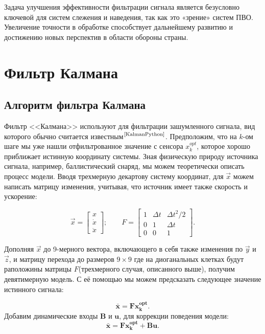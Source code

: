 \documentclass[a4paper,11pt]{article} %
\begin{document}
Задача улучшения эффективности фильтрации сигнала является безусловно ключевой для систем слежения и наведения, так как это «зрение» систем ПВО. Увеличение точности в обработке способствует дальнейшему развитию и достижению новых перспектив в области обороны страны.
\pagebreak

\section{Фильтр Калмана}
\subsection{Алгоритм фильтра Калмана}
Фильтр <<Калмана>> используют для фильтрации зашумленного сигнала,  вид которого обычно считается известным$^\text{\cite{KalmanPython}}$.
Предположим,  что на $k$-ом шаге мы уже нашли отфильтрованное значение с сенсора $x^{opt}_k$,  которое хорошо приближает истинную координату системы.  Зная физическую природу источника сигнала,  например,  баллистический снаряд,  мы можем теоретически описать процесс модели.  Вводя трехмерную декартову систему координат,  для  $\vec{x}$ можем написать матрицу изменения,  учитывая,   что источник имеет также скорость  и  ускорение:

\begin{equation}\label{xF}
\vec{x}=
\begin{bmatrix}
x\\
\dot{x}\\
\ddot{x}
\end{bmatrix} ;\qquad
F = \begin{bmatrix}1 & \Delta t & {\Delta t}^2/2 \\ 0 & 1 & \Delta t\\ 0& 0& 1\end{bmatrix}.
\end{equation}

Дополняя $\vec{x}$ до 9-мерного вектора,  включающего в себя также изменения по $\vec{y}$ и  $\vec{z}$, и матрицу  перехода до  размеров $9\times9$ где на  диоганальных клетках будут раположины матрицы $F$(трехмерного случая,  описанного выше),  получим девятимерную модель.   С её помощью  мы можем предсказать следующее значение истинного сигнала:

\[
\bar{\mathbf x} = \mathbf{Fx^{opt}_k}.
\]
Добавим динамические входы $\mathbf B$ и $\mathbf u$,  для коррекции поведения модели:
\begin{equation}\label{xFuB}
\bar{\mathbf x} = \mathbf{Fx^{opt}_k} + \mathbf{Bu}.
\end{equation}
\end{document}
